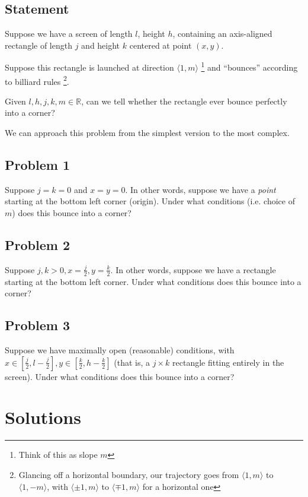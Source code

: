\documentclass[11pt, oneside]{article} 	%
\begin{document}
\subsection{Statement} 
Suppose we have a screen of length $l$, height $h$, containing an axis-aligned rectangle of length $j$ and height $k$ centered at point $(x, y)$.

Suppose this rectangle is launched at direction $\langle 1, m\rangle$ \footnote {Think of this as slope $m$} and ``bounces'' according to billiard rules \footnote{Glancing off a horizontal boundary, our trajectory goes from $\langle 1, m \rangle$ to $\langle 1, -m \rangle$, with $\langle \pm 1, m \rangle$ to $\langle \mp 1, m \rangle$ for a horizontal one}.

Given $l, h, j, k, m \in \mathbb{R}$, can we tell whether the rectangle ever bounce perfectly into a corner?  

We can approach this problem from the simplest version to the most complex.

\subsection{Problem 1} 

Suppose $j = k = 0$ and $x = y = 0$. In other words, suppose we have a \emph{point} starting at the bottom left corner
 (origin). Under what conditions (i.e. choice of $m$) does this bounce into a corner?


\subsection{Problem 2} 

Suppose $j, k > 0, x = \frac{j}{2}, y = \frac{k}{2}$. In other words, suppose we have a rectangle starting at the bottom left corner. Under what conditions does this bounce into a corner?

\subsection{Problem 3} 

Suppose we have maximally open (reasonable) conditions, with $x \in [\frac{j}{2}, l - \frac{j}{2}], y \in [\frac{k}{2}, h - \frac{k}{2}]$ (that is, a $j \times k$ rectangle fitting entirely in the screen). Under what conditions does this bounce into a corner?


\section{Solutions}
\end{document}
